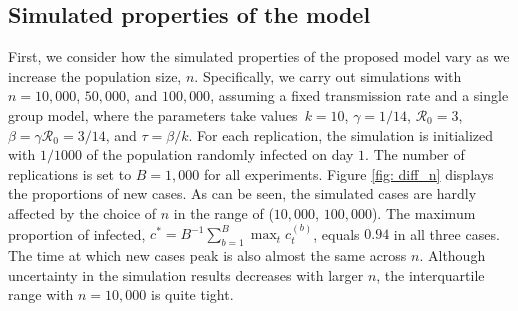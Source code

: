 \documentclass[12pt]{article}
\begin{document}
\subsection{Simulated properties of the model \label{Sup: properties}}

First, we consider how the simulated properties of the proposed model vary as
we increase the population size, $n$. Specifically, we carry out simulations
with $n=10,000$, $50,000$, and $100,000$, assuming a fixed transmission rate
and a single group model, where the parameters take values\ $k=10$,
$\gamma=1/14$, $\mathcal{R}_{0}=3$, $\beta=\gamma\mathcal{R}_{0}=3/14$, and
$\tau=\beta/k$. For each replication, the simulation is initialized with
$1/1000$ of the population randomly infected on day $1$. The number of
replications is set to $B=1,000$ for all experiments. Figure \ref{fig: diff_n}
displays the proportions of new cases. As can be seen, the simulated cases are
hardly affected by the choice of $n$ in the range of ($10,000$, $100,000$).
The maximum proportion of infected, $c^{\ast}=B^{-1}\sum_{b=1}^{B}\max
_{t}c_{t}^{(b)}$, equals $0.94$ in all three cases. The time at which new
cases peak is also almost the same across $n$. Although uncertainty in the
simulation results decreases with larger $n$, the interquartile range with
$n=10,000$ is quite tight.%
\end{document}
